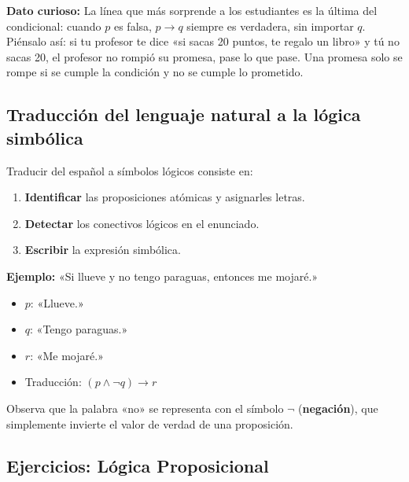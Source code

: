 \documentclass[12pt, letterpaper]{article}
\begin{document}
\begin{cuadroadvertencia}
  \textbf{Dato curioso:} La línea que más sorprende a los estudiantes es la última del condicional: cuando $p$ es falsa, $p \rightarrow q$ siempre es verdadera, sin importar $q$. Piénsalo así: si tu profesor te dice «si sacas 20 puntos, te regalo un libro» y tú no sacas 20, el profesor no rompió su promesa, pase lo que pase. Una promesa solo se rompe si se cumple la condición y no se cumple lo prometido.
\end{cuadroadvertencia}

\subsection{Traducción del lenguaje natural a la lógica simbólica}

Traducir del español a símbolos lógicos consiste en:
\begin{enumerate}
  \item \textbf{Identificar} las proposiciones atómicas y asignarles letras.
  \item \textbf{Detectar} los conectivos lógicos en el enunciado.
  \item \textbf{Escribir} la expresión simbólica.
\end{enumerate}

\noindent\textbf{Ejemplo:} «Si llueve y no tengo paraguas, entonces me mojaré.»
\begin{itemize}
  \item $p$: «Llueve.»
  \item $q$: «Tengo paraguas.»
  \item $r$: «Me mojaré.»
  \item Traducción: $(p \wedge \neg q) \rightarrow r$
\end{itemize}

Observa que la palabra «no» se representa con el símbolo $\neg$ (\textbf{negación}), que simplemente invierte el valor de verdad de una proposición.

\newpage

\subsection{Ejercicios: Lógica Proposicional}
\end{document}
